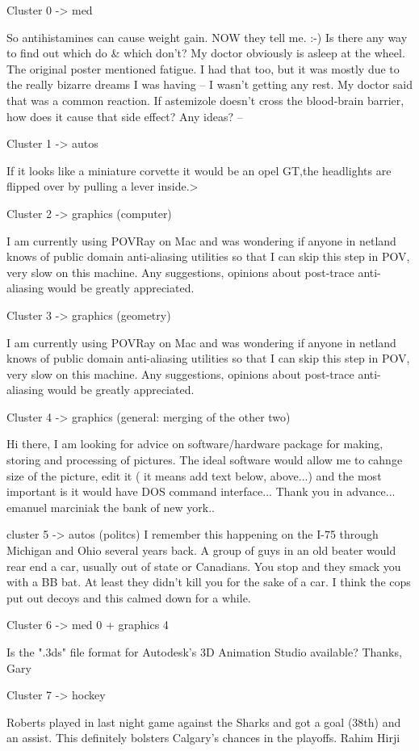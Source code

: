Cluster 0 -> med

So antihistamines can cause weight gain. NOW they tell me. :-) Is there any way
to find out which do & which don't? My doctor obviously is asleep at the wheel.
The original poster mentioned fatigue. I had that too, but it was mostly due to
the really bizarre dreams I was having -- I wasn't getting any rest. My doctor
said that was a common reaction. If astemizole doesn't cross the blood-brain
barrier, how does it cause that side effect? Any ideas? --

Cluster 1 -> autos

If it looks like a miniature corvette it would be an opel GT,the headlights are
flipped over by pulling a lever inside.>

Cluster 2 -> graphics (computer)

I am currently using POVRay on Mac and was wondering if anyone in netland knows
of public domain anti-aliasing utilities so that I can skip this step in POV,
very slow on this machine. Any suggestions, opinions about post-trace
anti-aliasing would be greatly appreciated.

Cluster 3 -> graphics (geometry)

I am currently using POVRay on Mac and was wondering if anyone in netland knows
of public domain anti-aliasing utilities so that I can skip this step in POV,
very slow on this machine. Any suggestions, opinions about post-trace
anti-aliasing would be greatly appreciated.

Cluster 4 -> graphics (general: merging of the other two)

Hi there, I am looking for advice on software/hardware package for making,
storing and processing of pictures. The ideal software would allow me to cahnge
size of the picture, edit it ( it means add text below, above...) and the most
important is it would have DOS command interface... Thank you in advance...
emanuel marciniak the bank of new york..

cluster 5 -> autos (politcs) I remember this happening on the I-75 through
Michigan and Ohio several years back. A group of guys in an old beater would
rear end a car, usually out of state or Canadians. You stop and they smack you
with a BB bat. At least they didn't kill you for the sake of a car. I think the
cops put out decoys and this calmed down for a while.

Cluster 6 -> med 0 + graphics 4

Is the ".3ds" file format for Autodesk's 3D Animation Studio available? Thanks,
Gary

Cluster 7 -> hockey

Roberts played in last night game against the Sharks and got a goal (38th) and an assist. This definitely bolsters Calgary's chances in the playoffs. Rahim Hirji